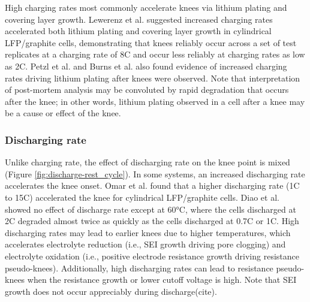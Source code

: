 \documentclass[journal=jpclcd,manuscript=article]{achemso}
\begin{document}
High charging rates most commonly accelerate knees via lithium plating and covering layer growth. Lewerenz et al.\cite{lewerenz_systematic_2017,lewerenz_post-mortem_2017} suggested increased charging rates accelerated both lithium plating and covering layer growth in cylindrical LFP/graphite cells, demonstrating that knees reliably occur across a set of test replicates at a charging rate of 8C and occur less reliably at charging rates as low as 2C. Petzl et al.\cite{petzl_lithium_2015} and Burns et al.\cite{burns_-situ_2015} also found evidence of increased charging rates driving lithium plating after knees were observed. Note that interpretation of post-mortem analysis may be convoluted by rapid degradation that occurs after the knee; in other words, lithium plating observed in a cell after a knee may be a cause or effect of the knee.

\subsubsection{Discharging rate}

Unlike charging rate, the effect of discharging rate on the knee point is mixed (Figure \ref{fig:discharge-rest_cycle}).
In some systems, an increased discharging rate
accelerates the knee onset.
Omar et al.\cite{omar_lithium_2014} found that a higher discharging rate (1C to 15C) accelerated the knee for cylindrical LFP/graphite cells.
Diao et al.\cite{diao_accelerated_2019} showed no effect of discharge rate except at 60°C, where the cells discharged at 2C degraded almost twice as quickly as the cells discharged at 0.7C or 1C.
High discharging rates may lead to earlier knees due to higher temperatures, which accelerates electrolyte reduction (i.e., SEI growth driving pore clogging) and electrolyte oxidation (i.e., positive electrode resistance growth driving resistance pseudo-knees). Additionally, high discharging rates can lead to resistance pseudo-knees when the resistance growth or lower cutoff voltage is high.\cite{ma_editors_2019}
Note that SEI growth does not occur appreciably during discharge(cite).
\end{document}
